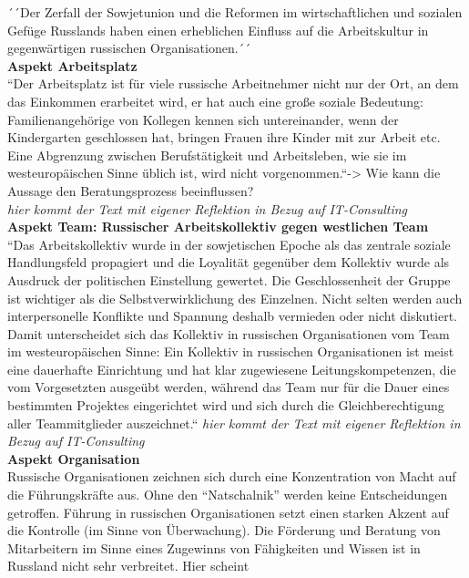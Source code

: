 	´´Der Zerfall der Sowjetunion und die Reformen im wirtschaftlichen und sozialen Gefüge Russlands haben einen erheblichen Einfluss auf die Arbeitskultur in gegenwärtigen russischen Organisationen.´´\\
		\textbf{Aspekt Arbeitsplatz}\\
	``Der Arbeitsplatz ist für viele russische Arbeitnehmer nicht nur der Ort, an dem das Einkommen erarbeitet wird, er hat auch eine große soziale Bedeutung: Familienangehörige von Kollegen kennen sich untereinander, wenn der Kindergarten geschlossen hat, bringen 
	Frauen ihre Kinder mit zur Arbeit etc. Eine Abgrenzung zwischen Berufstätigkeit und Arbeitsleben, wie sie im westeuropäischen Sinne üblich ist, wird nicht vorgenommen.``-> Wie kann die Aussage den Beratungsprozess beeinflussen?\\
	\textit{hier kommt der Text mit eigener Reflektion in Bezug auf IT-Consulting}\\
	\textbf{Aspekt Team: Russischer Arbeitskollektiv gegen westlichen Team}\\
	``Das Arbeitskollektiv wurde in der sowjetischen 
	Epoche als das zentrale soziale Handlungsfeld propagiert und die Loyalität gegenüber dem 
	Kollektiv wurde als Ausdruck der politischen Einstellung gewertet. Die Geschlossenheit 
	der Gruppe ist wichtiger als die Selbstverwirklichung des Einzelnen. Nicht selten werden 
	auch interpersonelle Konflikte und Spannung deshalb vermieden oder nicht diskutiert. 
	Damit unterscheidet sich das Kollektiv in russischen Organisationen vom Team im 
	westeuropäischen Sinne: Ein Kollektiv in russischen Organisationen ist meist eine 
	dauerhafte Einrichtung und hat klar zugewiesene Leitungskompetenzen, die vom 
	Vorgesetzten ausgeübt werden, während das Team nur für die Dauer eines bestimmten 
	Projektes eingerichtet wird und sich durch die Gleichberechtigung aller Teammitglieder 
	auszeichnet.`` 	%
	\textit{hier kommt der Text mit eigener Reflektion in Bezug auf IT-Consulting}
	\\
	\textbf{Aspekt Organisation}\\
	Russische Organisationen zeichnen sich durch eine Konzentration von Macht auf die 
	Führungskräfte aus. Ohne den “Natschalnik” werden keine Entscheidungen getroffen. 
	Führung in russischen Organisationen setzt einen starken Akzent auf die Kontrolle (im 
	Sinne von Überwachung). Die Förderung und Beratung von Mitarbeitern im Sinne eines 
	Zugewinns von Fähigkeiten und Wissen ist in Russland nicht sehr verbreitet. Hier scheint 
